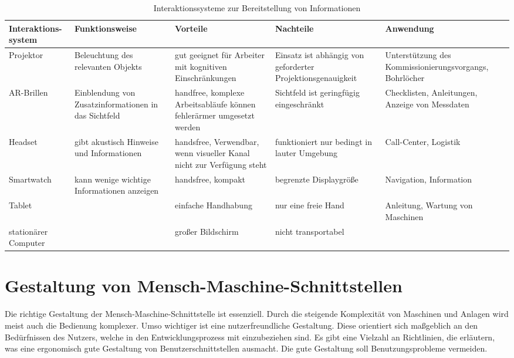 \begin{sidewaystable}[ph!]
\begin{tabular}{p{}|p{}|p{}|p{}|p{}}
	\textbf{Interaktions-system} & \textbf{Funktionsweise} & \textbf{Vorteile} & \textbf{Nachteile} & \textbf{Anwendung} \\
	\hline
	Projektor & Beleuchtung des relevanten Objekts & gut geeignet für Arbeiter mit kognitiven Einschränkungen & Einsatz ist abhängig von geforderter Projektionsgenauigkeit & Unterstützung des Kommissionierungsvorgangs, Bohrlöcher \\
	\hline
	AR-Brillen & Einblendung von Zusatzinformationen in das Sichtfeld & handfree, komplexe Arbeitsabläufe können fehlerärmer umgesetzt werden & Sichtfeld ist geringfügig eingeschränkt & Checklisten, Anleitungen, Anzeige von Messdaten \\
	\hline
	Headset & gibt akustisch Hinweise und Informationen & handsfree, Verwendbar, wenn visueller Kanal nicht zur Verfügung steht & funktioniert nur bedingt in lauter Umgebung & Call-Center, Logistik \\
	\hline
	Smartwatch & kann wenige wichtige Informationen anzeigen & handsfree, kompakt & begrenzte Displaygröße & Navigation, Information \\
	\hline
	Tablet & & einfache Handhabung & nur eine freie Hand & Anleitung, Wartung von Maschinen\\
	\hline
	stationärer Computer & & großer Bildschirm & nicht transportabel & \\
\end{tabular}
\label{tab:Interaktionssystem}
\caption{Interaktionssysteme zur Bereitstellung von Informationen}
\end{sidewaystable}

\section{Gestaltung von Mensch-Maschine-Schnittstellen}
Die richtige Gestaltung der Mensch-Maschine-Schnittstelle ist essenziell. Durch die steigende Komplexität von Maschinen und Anlagen wird meist auch die Bedienung komplexer. Umso wichtiger ist eine nutzerfreundliche Gestaltung. Diese orientiert sich maßgeblich an den Bedürfnissen des Nutzers, welche in den Entwicklungsprozess mit einzubeziehen sind. Es gibt eine Vielzahl an Richtlinien, die erläutern, was eine ergonomisch gute Gestaltung von Benutzerschnittstellen ausmacht. Die gute Gestaltung soll Benutzungsprobleme vermeiden.

